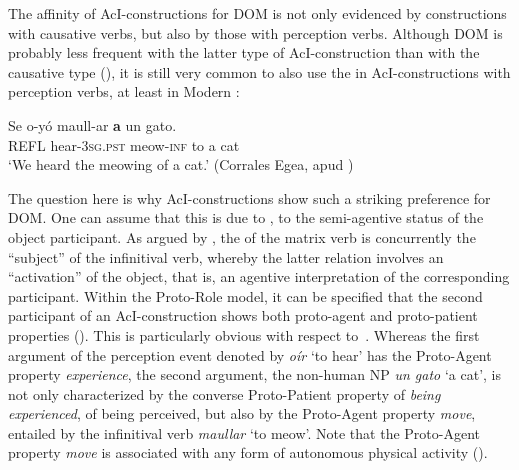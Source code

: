 \documentclass[output=paper]{LSP/langsci}
\begin{document}
The affinity of AcI-constructions for DOM is not only evidenced by constructions with causative verbs, but also by those with perception verbs. Although DOM is probably less frequent with the latter type of AcI-construction than with the causative type (\cf \citealt[316--317]{Roegiest2003Argument}), it is still very common to also use the  in AcI-constructions with perception verbs, at least in Modern : 

\ea \label{08-ga-ex:25}
\gll Se o-yó maull-ar \textbf{a} un gato.\\
\textsc{REFL} hear-3\textsc{sg.pst} meow-\textsc{inf} to a cat\\
\glt ‘We heard the meowing of a cat.’ (Corrales Egea, apud \citealt[50]{Roegiest1979Accusatif})

\z

The question here is why AcI-constructions show such a striking preference for DOM. One can assume that this is due to , \ie to the semi-agentive status of the object participant. As argued by \citet[50]{Roegiest1979Accusatif}, the  of the matrix verb is concurrently the “subject” of the infinitival verb, whereby the latter relation involves an “activation” of the object, that is, an agentive interpretation of the corresponding participant. Within the Proto-Role model, it can be specified that the second participant of an AcI-construction shows both proto-agent and proto-patient properties (\cf \citealt[161--162]{Primus1999Rektionsprinzipien}). This is particularly obvious with respect to~. Whereas the first argument of the perception event denoted by \textit{oír} ‘to hear’ has the Proto-Agent property \textit{experience}, the second argument, \ie the  non-human NP \textit{un gato} ‘a cat’, is not only characterized by the converse Proto-Patient property of \textit{being experienced}, \ie of being perceived, but also by the Proto-Agent property \textit{move}, entailed by the infinitival verb \textit{maullar} ‘to meow’. Note that the Proto-Agent property \textit{move} is associated with any form of autonomous physical activity (\cf \citealt[55]{Primus2006Hierarchy}). 
\end{document}
